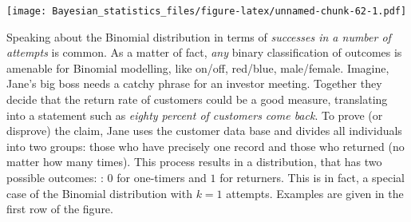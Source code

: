 \documentclass[]{svmono}
\newenvironment{Shaded}{\begin{snugshade}}{\end{snugshade}}
\newcommand{\KeywordTok}[1]{\textcolor[rgb]{0.13,0.29,0.53}{\textbf{#1}}}
\newcommand{\DataTypeTok}[1]{\textcolor[rgb]{0.13,0.29,0.53}{#1}}
\newcommand{\DecValTok}[1]{\textcolor[rgb]{0.00,0.00,0.81}{#1}}
\newcommand{\StringTok}[1]{\textcolor[rgb]{0.31,0.60,0.02}{#1}}
\newcommand{\OperatorTok}[1]{\textcolor[rgb]{0.81,0.36,0.00}{\textbf{#1}}}
\newcommand{\NormalTok}[1]{#1}
\theoremstyle{definition}
\theoremstyle{definition}
\theoremstyle{definition}
\theoremstyle{remark}
\begin{document}
\begin{Shaded}
\end{Shaded}

\texttt{[image: Bayesian\_statistics\_files/figure-latex/unnamed-chunk-62-1.pdf]}

Speaking about the Binomial distribution in terms of \emph{successes in
a number of attempts} is common. As a matter of fact, \emph{any} binary
classification of outcomes is amenable for Binomial modelling, like
on/off, red/blue, male/female. Imagine, Jane's big boss needs a catchy
phrase for an investor meeting. Together they decide that the return
rate of customers could be a good measure, translating into a statement
such as \emph{eighty percent of customers come back}. To prove (or
disprove) the claim, Jane uses the customer data base and divides all
individuals into two groups: those who have precisely one record and
those who returned (no matter how many times). This process results in a
distribution, that has two possible outcomes: : \(0\) for one-timers and
\(1\) for returners. This is in fact, a special case of the Binomial
distribution with \(k = 1\) attempts. Examples are given in the first
row of the figure.
\end{document}
